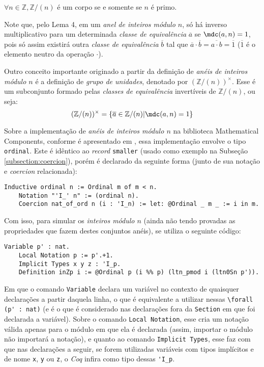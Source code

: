 \begin{lema}
    $\forall n \in \mathbb{Z}, \mathbb{Z}/(n)$ é um corpo se e somente se $n$ é primo. 
\end{lema}

Note que, pelo Lema 4, em um \textit{anel de inteiros módulo $n$}, só há inverso multiplicativo para um determinada \textit{classe de equivalência} $\overline{a}$ se $\mdc(a, n) = 1$, pois só assim existirá outra \textit{classe de equivalência} $\overline{b}$ tal que $\overline{a} \cdot \overline{b} = \overline{a \cdot b} = \overline{1}$ ($\overline{1}$ é o elemento neutro da operação $\cdot$).

Outro conceito importante originado a partir da definição de \textit{anéis de inteiros módulo $n$} é a definição de \textit{grupo de unidades}, denotado por $(\mathbb{Z}/(n))^{\times}$. Esse é um subconjunto formado pelas \textit{classes de equivalência} invertíveis de $\mathbb{Z}/(n)$, ou seja:
\begin{equation} \label{def:totientset}
    (\mathbb{Z}/(n))^{\times} = \{\overline{a} \in \mathbb{Z}/(n) | \mdc(a, n) = 1\}
\end{equation}

Sobre a implementação de \textit{anéis de inteiros módulo $n$} na biblioteca Mathematical Components, conforme é apresentado em \cite{assia_mahboubi_2022_7118596}, essa implementação envolve o tipo \lstinline[language = coq]{ordinal}. Este é idêntico ao \textit{record} \lstinline[language = coq]{smaller} (usado como exemplo na Subseção \ref{subsection:coercion}), porém é declarado da seguinte forma (junto de sua notação e \textit{coercion} relacionada):
\begin{lstlisting}[language = coq]
    Inductive ordinal n := Ordinal m of m < n.
    Notation "'I_' n" := (ordinal n).
    Coercion nat_of_ord n (i : 'I_n) := let: @Ordinal _ m _ := i in m.
\end{lstlisting}
Com isso, para simular os \textit{inteiros módulo $n$} (ainda não tendo provadas as propriedades que fazem destes conjuntos anéis), se utiliza o seguinte código:
\begin{lstlisting}[language = coq]
    Variable p' : nat.
    Local Notation p := p'.+1.
    Implicit Types x y z : 'I_p.
    Definition inZp i := @Ordinal p (i %% p) (ltn_pmod i (ltn0Sn p')).
\end{lstlisting}
Em que o comando \lstinline[language = coq]{Variable} declara um variável no contexto de quaisquer declarações a partir daquela linha, o que é equivalente a utilizar nessas \lstinline[language = coq]{\forall (p' : nat)} (e é o que é considerado nas declarações fora da \lstinline[language = coq]{Section} em que foi declarada a variável). Sobre o comando \lstinline[language = coq]{Local Notation}, esse cria um notação válida apenas para o módulo em que ela é declarada (assim, importar o módulo não importará a notação), e quanto ao comando \lstinline[language = coq]{Implicit Types}, esse faz com que nas declarações a seguir, se forem utilizadas variáveis com tipos implícitos e de nome \lstinline[language = coq]{x}, \lstinline[language = coq]{y} ou \lstinline[language = coq]{z}, o \textit{Coq} infira como tipo dessas \lstinline[language = coq]{'I_p}.

